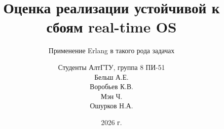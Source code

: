 \documentclass[aspectratio=169]{beamer}
\title{Оценка реализации устойчивой к сбоям real-time OS}
\subtitle{Применение Erlang в такого рода задачах}
\author{
	Студенты АлтГТУ, группа 8 ПИ-51\\
	Бельш А.Е.\\
	Воробьев К.В.\\
	Мэн Ч.\\
	Ошурков Н.А.
}
\date{2026 г.}
\begin{document}
	
	\frame{\titlepage}
	
	
	
	
	
	
	
	
	
	
	
	
	
	
	
	
	
	
	
	
	
	
	
	
	
	
	
	
\end{document}
